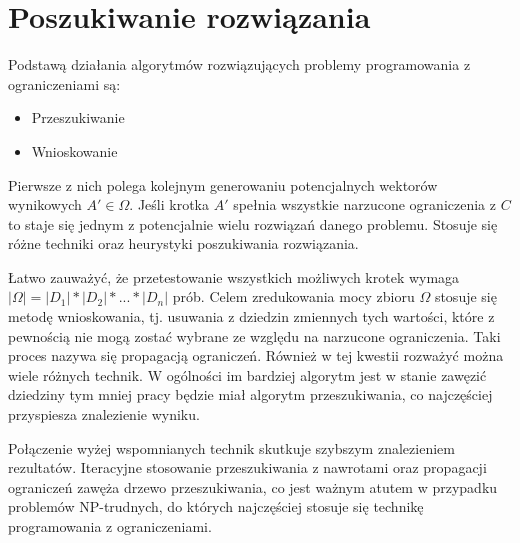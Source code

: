 \section{Poszukiwanie rozwiązania}
\par
Podstawą działania algorytmów rozwiązujących problemy programowania z ograniczeniami są:
\begin{itemize}
    \item Przeszukiwanie
    \item Wnioskowanie
\end{itemize}
Pierwsze z nich polega kolejnym generowaniu potencjalnych wektorów wynikowych 
$A' \in \Omega$. Jeśli krotka $A'$ spełnia wszystkie narzucone ograniczenia z $C$
to staje się jednym z potencjalnie wielu rozwiązań danego problemu. Stosuje się różne techniki
oraz heurystyki poszukiwania rozwiązania.
\par
Łatwo zauważyć, że przetestowanie wszystkich
możliwych krotek wymaga $|\Omega| = |D_1| * |D_2| * ... * |D_n|$ prób. Celem zredukowania mocy zbioru $\Omega$
stosuje się metodę wnioskowania, tj. usuwania z dziedzin zmiennych tych wartości, które z pewnością nie mogą zostać
wybrane ze względu na narzucone ograniczenia. Taki proces nazywa się propagacją ograniczeń. Również w tej kwestii
rozważyć można wiele różnych technik. W ogólności im bardziej algorytm jest w stanie zawęzić dziedziny tym
mniej pracy będzie miał algorytm przeszukiwania, co najczęściej przyspiesza znalezienie wyniku.
\par
Połączenie wyżej wspomnianych technik skutkuje szybszym znalezieniem rezultatów. Iteracyjne stosowanie przeszukiwania
z nawrotami oraz propagacji ograniczeń zawęża drzewo przeszukiwania, co jest ważnym atutem w przypadku problemów
NP-trudnych, do których najczęściej stosuje się technikę programowania z ograniczeniami.

